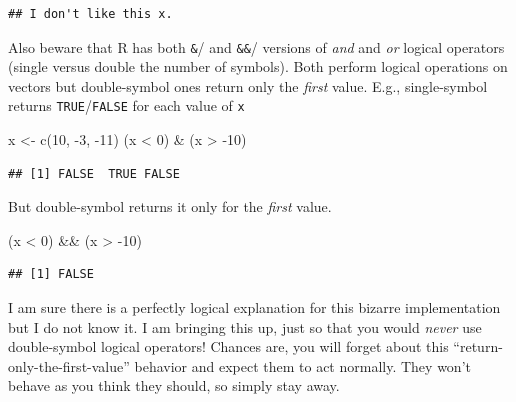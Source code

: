 \documentclass[
]{book}
\newenvironment{Shaded}{\begin{snugshade}}{\end{snugshade}}
\newcommand{\DecValTok}[1]{\textcolor[rgb]{0.00,0.00,0.81}{#1}}
\newcommand{\FunctionTok}[1]{\textcolor[rgb]{0.00,0.00,0.00}{#1}}
\newcommand{\NormalTok}[1]{#1}
\newcommand{\OtherTok}[1]{\textcolor[rgb]{0.56,0.35,0.01}{#1}}
\newcommand{\SpecialCharTok}[1]{\textcolor[rgb]{0.00,0.00,0.00}{#1}}
\begin{document}
\begin{verbatim}
## I don't like this x.
\end{verbatim}

Also beware that R has both \texttt{\&}/\texttt{\textbar{}} and \texttt{\&\&}/\texttt{\textbar{}\textbar{}} versions of \emph{and} and \emph{or} logical operators (single versus double the number of symbols). Both perform logical operations on vectors but double-symbol ones return only the \emph{first} value. E.g., single-symbol returns \texttt{TRUE}/\texttt{FALSE} for each value of \texttt{x}

\begin{Shaded}
\begin{Highlighting}[]
\NormalTok{x }\OtherTok{\textless{}{-}} \FunctionTok{c}\NormalTok{(}\DecValTok{10}\NormalTok{, }\SpecialCharTok{{-}}\DecValTok{3}\NormalTok{, }\SpecialCharTok{{-}}\DecValTok{11}\NormalTok{)}
\NormalTok{(x }\SpecialCharTok{\textless{}} \DecValTok{0}\NormalTok{) }\SpecialCharTok{\&}\NormalTok{ (x }\SpecialCharTok{\textgreater{}} \SpecialCharTok{{-}}\DecValTok{10}\NormalTok{)}
\end{Highlighting}
\end{Shaded}

\begin{verbatim}
## [1] FALSE  TRUE FALSE
\end{verbatim}

But double-symbol returns it only for the \emph{first} value.

\begin{Shaded}
\begin{Highlighting}[]
\NormalTok{(x }\SpecialCharTok{\textless{}} \DecValTok{0}\NormalTok{) }\SpecialCharTok{\&\&}\NormalTok{ (x }\SpecialCharTok{\textgreater{}} \SpecialCharTok{{-}}\DecValTok{10}\NormalTok{)}
\end{Highlighting}
\end{Shaded}

\begin{verbatim}
## [1] FALSE
\end{verbatim}

I am sure there is a perfectly logical explanation for this bizarre implementation but I do not know it. I am bringing this up, just so that you would \emph{never} use double-symbol logical operators! Chances are, you will forget about this ``return-only-the-first-value'' behavior and expect them to act normally. They won't behave as you think they should, so simply stay away.
\end{document}
